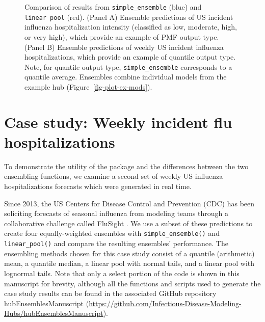 \documentclass[
  article,
  shortnames,
  notitle]{jss}
\begin{document}
\begin{figure}[H]


\caption{\label{fig-plot-ex-quantile-and-linear-pool}Comparison of
results from \texttt{simple\_ensemble} (blue) and \texttt{linear\ pool}
(red). (Panel A) Ensemble predictions of US incident influenza
hospitalization intensity (classified as low, moderate, high, or very
high), which provide an example of PMF output type. (Panel B) Ensemble
predictions of weekly US incident influenza hospitalizations, which
provide an example of quantile output type. Note, for quantile output
type, \texttt{simple\_ensemble} corresponds to a quantile average.
Ensembles combine individual models from the example hub
(Figure~\ref{fig-plot-ex-mods}).}

\end{figure}%

\section{Case study: Weekly incident flu
hospitalizations}\label{sec-flu}

To demonstrate the utility of the  package and the
differences between the two ensembling functions, we examine a second
set of weekly US influenza hospitalizations forecasts which were
generated in real time.

Since 2013, the US Centers for Disease Control and Prevention (CDC) has
been soliciting forecasts of seasonal influenza from modeling teams
through a collaborative challenge called FluSight \citep{cdc_flusight}.
We use a subset of these predictions to create four equally-weighted
ensembles with \texttt{simple\_ensemble()} and \texttt{linear\_pool()}
and compare the resulting ensembles' performance. The ensembling methods
chosen for this case study consist of a quantile (arithmetic) mean, a
quantile median, a linear pool with normal tails, and a linear pool with
lognormal tails. Note that only a select portion of the code is shown in
this manuscript for brevity, although all the functions and scripts used
to generate the case study results can be found in the associated GitHub
repository hubEnsemblesManuscript
(\url{https://github.com/Infectious-Disease-Modeling-Hubs/hubEnsemblesManuscript}).
\end{document}
